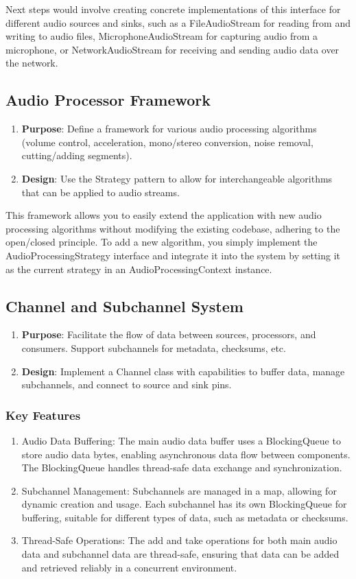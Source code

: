 \documentclass[a4paper,12pt]{article}
\begin{document}
Next steps would involve creating concrete implementations of this interface for different audio sources and sinks,
such as a FileAudioStream for reading from and writing to audio files, MicrophoneAudioStream for capturing audio from a microphone,
or NetworkAudioStream for receiving and sending audio data over the network.

\subsection{Audio Processor Framework}
\begin{enumerate}
  \item \textbf{Purpose}: Define a framework for various audio processing algorithms (volume control, acceleration, mono/stereo conversion, noise removal, cutting/adding segments).
  \item \textbf{Design}: Use the Strategy pattern to allow for interchangeable algorithms that can be applied to audio streams.
\end{enumerate}

This framework allows you to easily extend the application with new audio processing algorithms
without modifying the existing codebase, adhering to the open/closed principle.
To add a new algorithm, you simply implement the AudioProcessingStrategy interface and
integrate it into the system by setting it as the current strategy in an AudioProcessingContext instance.

\subsection{Channel and Subchannel System}
\begin{enumerate}
  \item \textbf{Purpose}: Facilitate the flow of data between sources, processors, and consumers. Support subchannels for metadata, checksums, etc.
  \item \textbf{Design}: Implement a Channel class with capabilities to buffer data, manage subchannels, and connect to source and sink pins.
\end{enumerate}

\subsubsection*{Key Features}
\begin{enumerate}
  \item Audio Data Buffering: The main audio data buffer uses a BlockingQueue to store audio data bytes, enabling asynchronous data flow between components. The BlockingQueue handles thread-safe data exchange and synchronization.
  \item Subchannel Management: Subchannels are managed in a map, allowing for dynamic creation and usage. Each subchannel has its own BlockingQueue for buffering, suitable for different types of data, such as metadata or checksums.
  \item Thread-Safe Operations: The add and take operations for both main audio data and subchannel data are thread-safe, ensuring that data can be added and retrieved reliably in a concurrent environment.
\end{enumerate}
\end{document}
